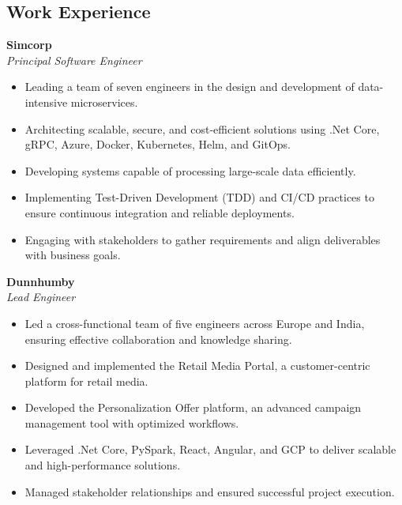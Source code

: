 \begin{tcolorbox}
\begin{minipage}[t]{0.7\textwidth}
\begin{tcolorbox}[grow to right by=0.75cm, height=0.8\textheight, colframe=white, colback=white]
               \section*{Work Experience}
                 \textbf{Simcorp} \hfill {} \\
                \textit{Principal Software Engineer}  
                \vspace{0.5em}
                \begin{itemize}
                    \item Leading a team of seven engineers in the design and development of data-intensive microservices.
                    \item Architecting scalable, secure, and cost-efficient solutions using .Net Core, gRPC, Azure, Docker, Kubernetes, Helm, and GitOps.
                    \item Developing systems capable of processing large-scale data efficiently.
                    \item Implementing Test-Driven Development (TDD) and CI/CD practices to ensure continuous integration and reliable deployments.
                    \item Engaging with stakeholders to gather requirements and align deliverables with business goals.
                \end{itemize}

                \vspace{1 em}
                \textbf{Dunnhumby} \hfill {} \\
                \textit{Lead Engineer}  
                \begin{itemize}
                     \item Led a cross-functional team of five engineers across Europe and India, ensuring effective collaboration and knowledge sharing.
                    \item Designed and implemented the Retail Media Portal, a customer-centric platform for retail media.
                    \item Developed the Personalization Offer platform, an advanced campaign management tool with optimized workflows.
                    \item Leveraged .Net Core, PySpark, React, Angular, and GCP to deliver scalable and high-performance solutions.
                    \item Managed stakeholder relationships and ensured successful project execution.
                \end{itemize}
            \end{tcolorbox}
        \end{minipage}
    \end{tcolorbox}
    

